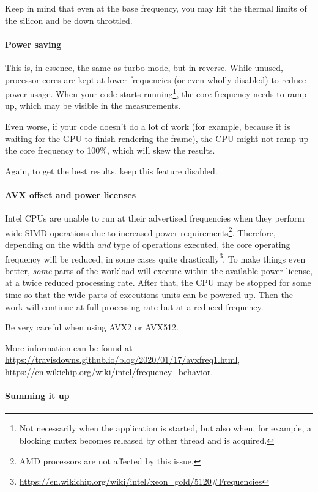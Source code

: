 \documentclass[hidelinks,titlepage,a4paper]{article}
\begin{document}
Keep in mind that even at the base frequency, you may hit the thermal limits of the silicon and be down throttled.

\paragraph{Power saving}

This is, in essence, the same as turbo mode, but in reverse. While unused, processor cores are kept at lower frequencies (or even wholly disabled) to reduce power usage. When your code starts running\footnote{Not necessarily when the application is started, but also when, for example, a blocking mutex becomes released by other thread and is acquired.}, the core frequency needs to ramp up, which may be visible in the measurements.

Even worse, if your code doesn't do a lot of work (for example, because it is waiting for the GPU to finish rendering the frame), the CPU might not ramp up the core frequency to 100\%, which will skew the results.

Again, to get the best results, keep this feature disabled.

\paragraph{AVX offset and power licenses}

Intel CPUs are unable to run at their advertised frequencies when they perform wide SIMD operations due to increased power requirements\footnote{AMD processors are not affected by this issue.}. Therefore, depending on the width \emph{and} type of operations executed, the core operating frequency will be reduced, in some cases quite drastically\footnote{\url{https://en.wikichip.org/wiki/intel/xeon_gold/5120\#Frequencies}}. To make things even better, \emph{some} parts of the workload will execute within the available power license, at a twice reduced processing rate. After that, the CPU may be stopped for some time so that the wide parts of executions units can be powered up. Then the work will continue at full processing rate but at a reduced frequency.

Be very careful when using AVX2 or AVX512.

More information can be found at \url{https://travisdowns.github.io/blog/2020/01/17/avxfreq1.html}, \url{https://en.wikichip.org/wiki/intel/frequency_behavior}.

\paragraph{Summing it up}
\label{ryzen}
\end{document}
